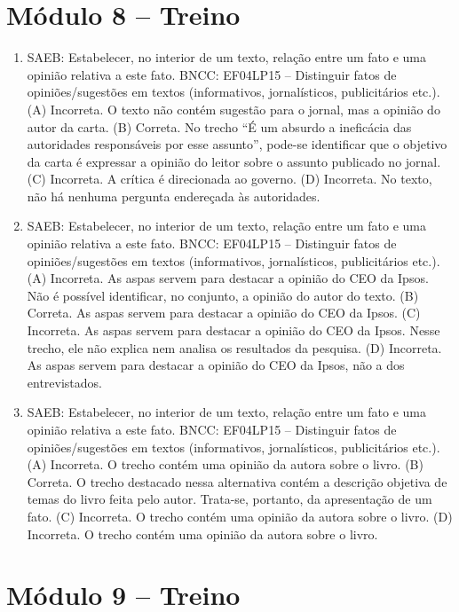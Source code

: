 \section*{Módulo 8 – Treino}

\begin{enumerate}
\item
SAEB: Estabelecer, no interior de um texto, relação entre um fato e
uma opinião relativa a este fato.
BNCC: EF04LP15 -- Distinguir fatos de opiniões/sugestões em textos
(informativos, jornalísticos, publicitários etc.).
(A)  Incorreta. O texto não contém sugestão para o jornal, mas a
opinião do autor da carta.
(B)  Correta. No trecho ``É um absurdo a ineficácia das autoridades
responsáveis por esse assunto'', pode-se identificar que o objetivo da
carta é expressar a opinião do leitor sobre o assunto publicado no jornal.
(C)  Incorreta. A crítica é direcionada ao governo.
(D)  Incorreta. No texto, não há nenhuma pergunta endereçada às autoridades.

\item
SAEB: Estabelecer, no interior de um texto, relação entre um fato e
uma opinião relativa a este fato.
BNCC: EF04LP15 -- Distinguir fatos de opiniões/sugestões em textos
(informativos, jornalísticos, publicitários etc.).
(A) Incorreta. As aspas servem para destacar a opinião do CEO da Ipsos. 
Não é possível identificar, no conjunto, a opinião do autor do texto.  
(B) Correta. As aspas servem para destacar a opinião do CEO da Ipsos.
(C) Incorreta. As aspas servem para destacar a opinião do CEO da Ipsos.
Nesse trecho, ele não explica nem analisa os resultados da pesquisa.
(D) Incorreta. As aspas servem para destacar a opinião do CEO da Ipsos, não
a dos entrevistados.

\item
SAEB: Estabelecer, no interior de um texto, relação entre um fato e
uma opinião relativa a este fato.
BNCC: EF04LP15 -- Distinguir fatos de opiniões/sugestões em textos
(informativos, jornalísticos, publicitários etc.).
(A) Incorreta. O trecho contém uma opinião da autora sobre o livro.
(B) Correta. O trecho destacado nessa alternativa contém a descrição
objetiva de temas do livro feita pelo autor. Trata-se, portanto, da apresentação de 
um fato. 
(C) Incorreta. O trecho contém uma opinião da autora sobre o livro.
(D) Incorreta. O trecho contém uma opinião da autora sobre o livro.
\end{enumerate}

\section*{Módulo 9 – Treino}

